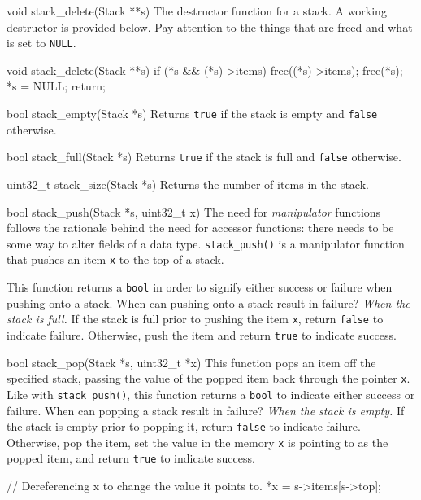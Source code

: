 \begin{funcdoc}{void stack\_delete(Stack **s)}
  The destructor function for a stack. A working destructor is provided
  below. Pay attention to the things that are freed and what is set to
  \texttt{NULL}.

  \begin{clisting}{}
void stack_delete(Stack **s) {
    if (*s && (*s)->items) {
        free((*s)->items);
        free(*s);
        *s = NULL;
    }
    return;
}
  \end{clisting}
\end{funcdoc}


\begin{funcdoc}{bool stack\_empty(Stack *s)}
  Returns \texttt{true} if the stack is empty and \texttt{false}
  otherwise.
\end{funcdoc}

\begin{funcdoc}{bool stack\_full(Stack *s)}
  Returns \texttt{true} if the stack is full and \texttt{false} otherwise.
\end{funcdoc}

\begin{funcdoc}{uint32\_t stack\_size(Stack *s)}
  Returns the number of items in the stack.
\end{funcdoc}

\begin{funcdoc}{bool stack\_push(Stack *s, uint32\_t x)}
  The need for \emph{manipulator} functions follows the rationale behind
  the need for accessor functions: there needs to be some way to alter
  fields of a data type. \texttt{stack\_push()} is a manipulator function
  that pushes an item \texttt{x} to the top of a stack.

  This function returns a \texttt{bool} in order to signify either
  success or failure when pushing onto a stack. When can pushing onto a
  stack result in failure? \emph{When the stack is full.} If the stack
  is full prior to pushing the item \texttt{x}, return \texttt{false} to
  indicate failure. Otherwise, push the item and return \texttt{true} to
  indicate success.
\end{funcdoc}

\begin{funcdoc}{bool stack\_pop(Stack *s, uint32\_t *x)}
  This function pops an item off the specified stack, passing the value
  of the popped item back through the pointer \texttt{x}. Like with
  \texttt{stack\_push()}, this function returns a \texttt{bool} to
  indicate either success or failure. When can popping a stack result in
  failure? \emph{When the stack is empty.} If the stack is empty prior to
  popping it, return \texttt{false} to indicate failure. Otherwise, pop
  the item, set the value in the memory \texttt{x} is pointing to as the
  popped item, and return \texttt{true} to indicate success.

  \begin{clisting}{}
// Dereferencing x to change the value it points to.
*x = s->items[s->top];
  \end{clisting}
\end{funcdoc}

